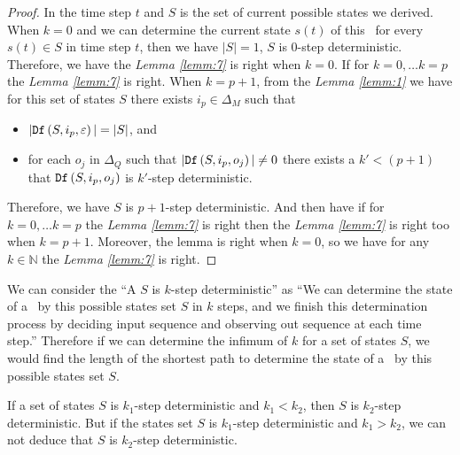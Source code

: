 \begin{proof}
In the time step $t$ and $S$ is the set of current possible states we derived. 
When $k=0$ and we can determine the current state $s(t)$ of this \BCN\ for every $s(t)\in S$ in time step $t$, then we have $|S|=1$, $S$ is $0$-step deterministic. Therefore, we have the {\em Lemma \ref{lemm:7}} is right when $k=0$. If for $k=0,\ldots k=p$ the {\em Lemma \ref{lemm:7}} is right. When $k=p+1$, from the {\em Lemma \ref{lemm:1}} we have for this set of states $S$ there exists $i_p \in \Delta_M$ such that
 \begin{itemize}
 \item  $|{\tt Df}\left(S,i_p,\varepsilon\right)|=|S|$, and 
 \item  for each $o_j$ in $\Delta_Q$ such that $|{\tt Df}\left(S,i_p,o_j\right)|\neq 0$ there exists a ${k'}<(p+1)$ that ${\tt Df}\left(S,i_p,o_j\right)$ is $k'$-step deterministic.
 \end{itemize} Therefore, we have $S$ is $p+1$-step deterministic. And then have if for $k=0,\ldots k=p$ the {\em Lemma \ref{lemm:7}} is right then the {\em Lemma \ref{lemm:7}} is right too when $k=p+1$. Moreover, the lemma is right when $k=0$, so we have for any $k\in \mathbb{N}$ the {\em Lemma \ref{lemm:7}} is right.
\end{proof}

We can consider the ``A $S$ is $k$-step deterministic'' as ``We can determine the state of a \BCN\ by this possible states set $S$ in $k$ steps, and we finish this determination process by deciding input sequence and observing out sequence at each time step.'' Therefore if we can determine the infimum of $k$ for a set of states $S$, we would find the length of the shortest path to determine the state of a \BCN\ by this possible states set $S$.
\begin{lemma}
 If a set of states $S$ is $k_1$-step deterministic and $k_1< k_2$, then $S$ is $k_2$-step deterministic. But if the states set $S$ is $k_1$-step deterministic and $k_1> k_2$, we can not deduce that $S$ is $k_2$-step deterministic. 
  \label{lemm:2}
\end{lemma}

